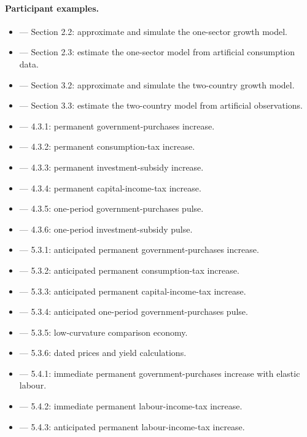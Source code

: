 \documentclass[12pt]{article}
\begin{document}
\paragraph{Participant examples.}
\begin{itemize}
  \item {} --- Section 2.2: approximate and simulate the one-sector growth model.
  \item {} --- Section 2.3: estimate the one-sector model from artificial consumption data.
  \item {} --- Section 3.2: approximate and simulate the two-country growth model.
  \item {} --- Section 3.3: estimate the two-country model from artificial observations.
  \item {} --- 4.3.1: permanent government-purchases increase.
  \item {} --- 4.3.2: permanent consumption-tax increase.
  \item {} --- 4.3.3: permanent investment-subsidy increase.
  \item {} --- 4.3.4: permanent capital-income-tax increase.
  \item {} --- 4.3.5: one-period government-purchases pulse.
  \item {} --- 4.3.6: one-period investment-subsidy pulse.
  \item {} --- 5.3.1: anticipated permanent government-purchases increase.
  \item {} --- 5.3.2: anticipated permanent consumption-tax increase.
  \item {} --- 5.3.3: anticipated permanent capital-income-tax increase.
  \item {} --- 5.3.4: anticipated one-period government-purchases pulse.
  \item {} --- 5.3.5: low-curvature comparison economy.
  \item {} --- 5.3.6: dated prices and yield calculations.
  \item {} --- 5.4.1: immediate permanent government-purchases increase with elastic labour.
  \item {} --- 5.4.2: immediate permanent labour-income-tax increase.
  \item {} --- 5.4.3: anticipated permanent labour-income-tax increase.
\end{itemize}
\end{document}
